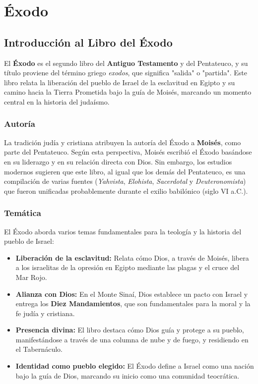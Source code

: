 \chapter{Éxodo}


\section*{Introducción al Libro del Éxodo}

El \textbf{Éxodo} es el segundo libro del \textbf{Antiguo Testamento} y del Pentateuco, y su título proviene del término griego \textit{exodos}, que significa "salida" o "partida". Este libro relata la liberación del pueblo de Israel de la esclavitud en Egipto y su camino hacia la Tierra Prometida bajo la guía de Moisés, marcando un momento central en la historia del judaísmo.

\subsection*{Autoría}

La tradición judía y cristiana atribuyen la autoría del Éxodo a \textbf{Moisés}, como parte del Pentateuco. Según esta perspectiva, Moisés escribió el Éxodo basándose en su liderazgo y en su relación directa con Dios. Sin embargo, los estudios modernos sugieren que este libro, al igual que los demás del Pentateuco, es una compilación de varias fuentes (\textit{Yahvista}, \textit{Elohista}, \textit{Sacerdotal} y \textit{Deuteronomista}) que fueron unificadas probablemente durante el exilio babilónico (siglo VI a.C.).

\subsection*{Temática}

El Éxodo aborda varios temas fundamentales para la teología y la historia del pueblo de Israel:
\begin{itemize}
	\item \textbf{Liberación de la esclavitud:} Relata cómo Dios, a través de Moisés, libera a los israelitas de la opresión en Egipto mediante las plagas y el cruce del Mar Rojo.
	\item \textbf{Alianza con Dios:} En el Monte Sinaí, Dios establece un pacto con Israel y entrega los \textbf{Diez Mandamientos}, que son fundamentales para la moral y la fe judía y cristiana.
	\item \textbf{Presencia divina:} El libro destaca cómo Dios guía y protege a su pueblo, manifestándose a través de una columna de nube y de fuego, y residiendo en el Tabernáculo.
	\item \textbf{Identidad como pueblo elegido:} El Éxodo define a Israel como una nación bajo la guía de Dios, marcando su inicio como una comunidad teocrática.
\end{itemize}



